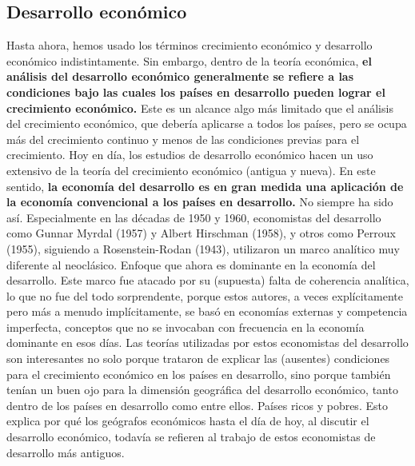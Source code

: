 \subsection{Desarrollo económico}
Hasta ahora, hemos usado los términos crecimiento económico y desarrollo económico indistintamente. Sin embargo, dentro de la teoría económica, \textbf{el análisis del desarrollo económico generalmente se refiere a las condiciones bajo las cuales los países en desarrollo pueden lograr el crecimiento económico.} Este es un alcance algo más limitado que el análisis del crecimiento económico, que debería aplicarse a todos los países, pero se ocupa más del crecimiento continuo y menos de las condiciones previas para el crecimiento. Hoy en día, los estudios de desarrollo económico hacen un uso extensivo de la teoría del crecimiento económico (antigua y nueva). En este sentido, \textbf{la economía del desarrollo es en gran medida una aplicación de la economía convencional a los países en desarrollo.} No siempre ha sido así. Especialmente en las décadas de 1950 y 1960, economistas del desarrollo como Gunnar Myrdal (1957) y Albert Hirschman (1958), y otros como Perroux (1955), siguiendo a Rosenstein-Rodan (1943), utilizaron un marco analítico muy diferente al neoclásico. Enfoque que ahora es dominante en la economía del desarrollo. Este marco fue atacado por su (supuesta) falta de coherencia analítica, lo que no fue del todo sorprendente, porque estos autores, a veces explícitamente pero más a menudo implícitamente, se basó en economías externas y competencia imperfecta, conceptos que no se invocaban con frecuencia en la economía dominante en esos días. Las teorías utilizadas por estos economistas del desarrollo son interesantes no solo porque trataron de explicar las (ausentes) condiciones para el crecimiento económico en los países en desarrollo, sino porque también tenían un buen ojo para la dimensión geográfica del desarrollo económico, tanto dentro de los países en desarrollo como entre ellos. Países ricos y pobres. Esto explica por qué los geógrafos económicos hasta el día de hoy, al discutir el desarrollo económico, todavía se refieren al trabajo de estos economistas de desarrollo más antiguos.\\
